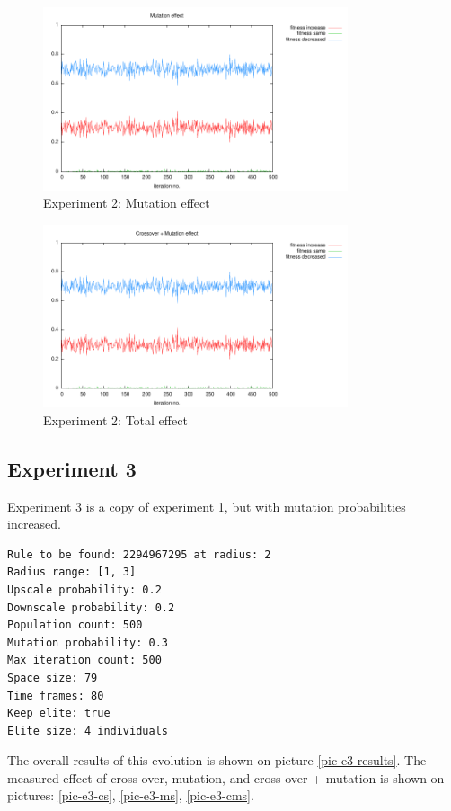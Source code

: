 \documentclass[12pt,a4paper]{article}
\begin{document}
\begin{figure}
\centering
\includegraphics[width=0.8\textwidth]{results/2/1-ms.pdf}
\caption{Experiment 2: Mutation effect}
\label{pic-e2-ms}
\end{figure}

\begin{figure}
\centering
\includegraphics[width=0.8\textwidth]{results/2/1-cms.pdf}
\caption{Experiment 2: Total effect}
\label{pic-e2-cms}
\end{figure}



\subsection{Experiment 3}
Experiment 3 is a copy of experiment 1, but with mutation probabilities increased.

\begin{verbatim}
Rule to be found: 2294967295 at radius: 2
Radius range: [1, 3]
Upscale probability: 0.2
Downscale probability: 0.2
Population count: 500
Mutation probability: 0.3
Max iteration count: 500
Space size: 79
Time frames: 80
Keep elite: true
Elite size: 4 individuals
\end{verbatim}

The overall results of this evolution is shown on picture \ref{pic-e3-results}. The measured effect of cross-over, mutation, and cross-over + mutation is shown on pictures: \ref{pic-e3-cs}, \ref{pic-e3-ms}, \ref{pic-e3-cms}.
\end{document}
